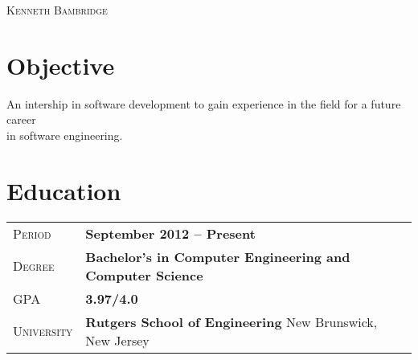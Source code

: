 \documentclass[a4paper, oneside, final]{scrartcl} %
\newcommand{\gray}{\rowcolor[gray]{.90}} %
\begin{document}
\begin{center} %


{\fontsize{30}{30}\selectfont\scshape Kenneth Bambridge} %

\vspace{0.8cm} %


\section{Objective}

An intership in software development to gain experience in the field for a future career \\ in software engineering.


\section{Education}

\begin{tabularx}{0.97\linewidth}{>{\raggedleft\scshape}p{2cm}X}
\gray Period & \textbf{September 2012 -- Present}\\
\gray Degree & \textbf{Bachelor's in Computer Engineering and Computer Science}\\
\gray GPA & \textbf{3.97/4.0}\\
\gray University & \textbf{Rutgers School of Engineering} \hfill New Brunswick, New Jersey\\
\end{tabularx}

\vspace{12pt}


\end{center}
\end{document}
